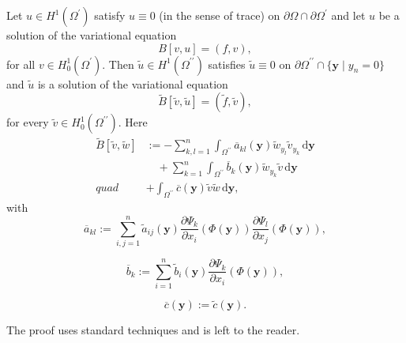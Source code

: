 \begin{Lemma}
\label{lem:boundary-coordinate-variational-transformation}
Let $u\in H^1(\Omega^{\prime})$ satisfy $u\equiv0$ (in the sense of trace) on $\partial\Omega\cap\partial\Omega^{\prime}$ and let $u$ be a solution of the variational equation
\begin{equation}\label{eq:boundary-coordinate-original-variational-equation}
B[v,u]=(f,v),
\end{equation}
for all $v\in H_0^1(\Omega^{\prime})$. Then $\widetilde u\in H^1(\Omega^{\prime\prime})$ satisfies $\widetilde u\equiv0$ on $\partial\Omega^{\prime\prime}\cap\{\bm{y}\mid y_n=0\}$ and $\widetilde u$ is a solution of the variational equation
\begin{equation}\label{eq:boundary-coordinate-transformed-variational-equation}
\widetilde B[\widetilde v,\widetilde u]=(\widetilde f,\widetilde v),
\end{equation}
for every $\widetilde v\in H_0^1(\Omega^{\prime\prime})$. Here
\begin{equation}\label{eq:boundary-coordinate-transformed-bilinear-form}
\begin{aligned}
\widetilde B[\widetilde v,\widetilde w]&:=-\sum_{k,l=1}^n\int_{\Omega^{\prime\prime}}\overline a_{kl}(\bm{y})\widetilde w_{y_l}\widetilde v_{y_k}\,\mathrm{d}\bm{y}\\
&\quad+\sum_{k=1}^n\int_{\Omega^{\prime\prime}}\overline b_k(\bm{y})\widetilde w_{y_k}\widetilde v\,\mathrm{d}\bm{y}\\
\mathit{quad}&+\int_{\Omega^{\prime\prime}}\overline c(\bm{y})\widetilde v\widetilde w\,\mathrm{d}\bm{y},
\end{aligned}
\end{equation}
with
\begin{equation}\label{eq:boundary-coordinate-transformed-principal-coefficients}
\overline a_{kl}:=\sum_{i,j=1}^n\widetilde a_{ij}(\bm{y})\frac{\partial\Psi_k}{\partial x_i}(\Phi(\bm{y}))\frac{\partial\Psi_l}{\partial x_j}(\Phi(\bm{y})), 
\end{equation}

\begin{equation}\label{eq:boundary-coordinate-transformed-first-order-coefficients}
\overline b_k:=\sum_{i=1}^n\widetilde b_i(\bm{y})\frac{\partial\Psi_k}{\partial x_i}(\Phi(\bm{y})), 
\end{equation}

\begin{equation}\label{eq:boundary-coordinate-transformed-zero-order-coefficient}
\overline c(\bm{y}):=\widetilde c(\bm{y}).
\end{equation}

\end{Lemma}

The proof uses standard techniques and is left to the reader.
